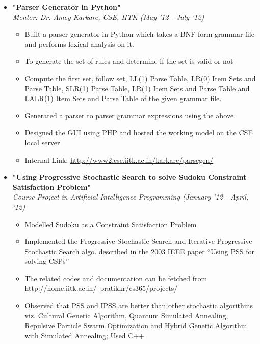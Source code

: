 \documentclass[margin,line]{resume}
\begin{document}
\begin{resume}
\begin{itemize}
  \item \large{\textbf{\textsf{"Parser Generator in Python"}}}
    \\ \small{\textit{Mentor: Dr. Amey Karkare, CSE, IITK (May '12 - July '12)}}
    \normalsize
    \begin{itemize}
      \item Built a parser generator in Python which takes a BNF form grammar file and performs lexical analysis on it.
      \item To generate the set of rules and determine if the set is valid or not
      \item Compute the first set, follow set, LL(1) Parse Table, LR(0) Item Sets and Parse Table, SLR(1) Parse Table, LR(1) Item Sets and Parse Table and LALR(1) Item Sets and Parse Table of the given grammar file.
      \item Generated a parser to parser grammar expressions using the above.
      \item Designed the GUI using PHP and hosted the working model on the CSE local server. 
      \item Internal Link: \url{http://www2.cse.iitk.ac.in/karkare/parsegen/}
    \end{itemize}

  \item \large{\textbf{\textsf{"Using Progressive Stochastic Search to solve Sudoku Constraint Satisfaction Problem"}}}
    \\ \small{\textit{Course Project in Artificial Intelligence Programming (January '12 - April, '12)}}
    \normalsize
    \begin{itemize}
    \item Modelled Sudoku as a Constraint Satisfaction Problem
    \item Implemented the Progressive Stochastic Search and Iterative Progressive Stochastic Search algo. described in the 2003 IEEE paper ``Using PSS for solving CSPs''
    \item The related codes and documentation can be fetched from http://home.iitk.ac.in/~pratikkr/cs365/projects/
    \item  Observed that PSS and IPSS are better than other stochastic algorithms viz. Cultural Genetic Algorithm, Quantum Simulated Annealing, Repulsive Particle Swarm Optimization and Hybrid Genetic Algorithm with Simulated Annealing; Used C++
    \end{itemize}


\end{itemize}
\end{resume}
\end{document}
